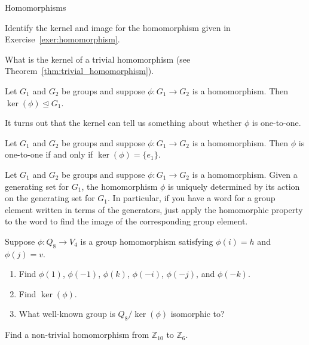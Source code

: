 \begin{section}{Homomorphisms}
\begin{exercise}
Identify the kernel and image for the homomorphism given in Exercise~\ref{exer:homomorphism}.
\end{exercise}

\begin{exercise}
What is the kernel of a trivial homomorphism (see Theorem~\ref{thm:trivial_homomorphism}).
\end{exercise}

\begin{theorem}\label{thm:kernel_normal}
Let $G_1$ and $G_2$ be groups and suppose $\phi:G_1\to G_2$ is a homomorphism. Then $\ker(\phi)\trianglelefteq G_1$.
\end{theorem}

It turns out that the kernel can tell us something about whether $\phi$ is one-to-one.

\begin{theorem}
Let $G_1$ and $G_2$ be groups and suppose $\phi:G_1\to G_2$ is a homomorphism. Then $\phi$ is one-to-one if and only if $\ker(\phi)=\{e_1\}$.
\end{theorem}

\begin{remark}
Let $G_1$ and $G_2$ be groups and suppose $\phi:G_1\to G_2$ is a homomorphism. Given a generating set for $G_1$, the homomorphism $\phi$ is uniquely determined by its action on the generating set for $G_1$.  In particular, if you have a word for a group element written in terms of the generators, just apply the homomorphic property to the word to find the image of the corresponding group element.
\end{remark}

\begin{exercise}\label{exer:Q8toV4}
Suppose $\phi: Q_8\to V_{4}$ is a group homomorphism satisfying $\phi(i)=h$ and $\phi(j)=v$.
\begin{enumerate}[label=\rm{(\alph*)}]
\item Find $\phi(1)$, $\phi(-1)$, $\phi(k)$, $\phi(-i)$, $\phi(-j)$, and $\phi(-k)$.
\item Find $\ker(\phi)$.
\item What well-known group is $Q_8/\ker(\phi)$ isomorphic to?
\end{enumerate}
\end{exercise}

\begin{exercise}
Find a non-trivial homomorphism from $\mathbb{Z}_{10}$ to $\mathbb{Z}_6$.
\end{exercise}


\end{section}
